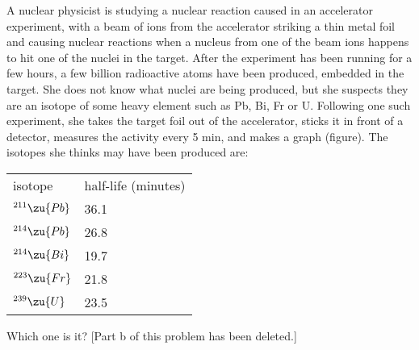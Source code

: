A nuclear physicist is studying a nuclear reaction
caused in an accelerator experiment, with a beam of ions
from the accelerator striking a thin metal foil and causing
nuclear reactions when a nucleus from one of the beam ions
happens to hit one of the nuclei in the target.  After the
experiment has been running for a few hours, a few billion
radioactive atoms have been produced, embedded in the
target.  She does not know what nuclei are being produced,
but she suspects they are an isotope of some heavy element
such as Pb, Bi, Fr or U. Following one such experiment,
she takes the target foil out of the accelerator, sticks it
in front of a detector, measures the activity every 5 min,
and makes a graph (figure).  The isotopes she thinks may
have been produced are:

\begin{tabular}{ll}
isotope         & half-life (minutes)\\
$^{211}\zu{Pb}$ & 36.1\\
$^{214}\zu{Pb}$ & 26.8\\
$^{214}\zu{Bi}$ & 19.7\\
$^{223}\zu{Fr}$ & 21.8\\
$^{239}\zu{U}$ & 23.5\\
\end{tabular}

\noindent Which one is it?
[Part b of this problem has been deleted.]
